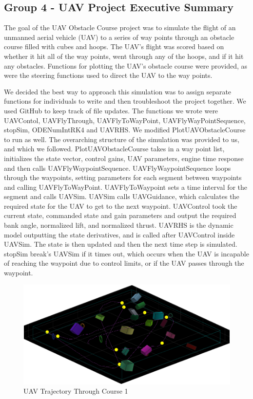 \documentclass[12pt]{article}
\begin{document}
\subsection*{\centering Group 4 - UAV Project Executive Summary}

The goal of the UAV Obstacle Course project was to simulate the flight of an unmanned aerial vehicle (UAV) to a series of way points through an obstacle course filled with cubes and hoops. The UAV’s flight was scored based on whether it hit all of the way points, went through any of the hoops, and if it hit any obstacles. Functions for plotting the UAV’s obstacle course were provided, as were the steering functions used to direct the UAV to the way points.

We decided the best way to approach this simulation was to assign separate functions for individuals to write and then troubleshoot the project together. We used GitHub to keep track of file updates. The functions we wrote were UAVContol, UAVFlyThrough, UAVFlyToWayPoint, UAVFlyWayPointSequence, stopSim, ODENumIntRK4 and UAVRHS. We modified PlotUAVObstacleCourse to run as well. The overarching structure of the simulation was provided to us, and which we followed. PlotUAVObstacleCourse takes in a way point list, initializes the state vector, control gains, UAV parameters, engine time response and then calls UAVFlyWaypointSequence. UAVFlyWaypointSequence loops through the waypoints, setting parameters for each segment between waypoints and calling UAVFlyToWayPoint. UAVFlyToWaypoint sets a time interval for the segment and calls UAVSim. UAVSim calls UAVGuidance, which calculates the required state for the UAV to get to the next waypoint. UAVControl took the current state, commanded state and gain parameters and output the required bank angle, normalized lift, and normalized thrust. UAVRHS is the dynamic model outputting the state derivatives, and is called after UAVControl inside UAVSim. The state is then updated and then the next time step is simulated. stopSim break’s UAVSim if it times out, which occurs when the UAV is incapable of reaching the waypoint due to control limits, or if the UAV passes through the waypoint. 

\begin{figure}
	\begin{center}
		\includegraphics[scale=0.5]{Figure1}
		\caption{UAV Trajectory Through Course 1}
	\end{center}
\end{figure} 
\end{document}

